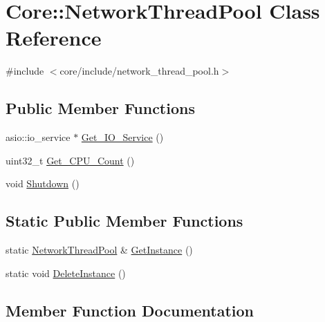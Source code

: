 \hypertarget{classCore_1_1NetworkThreadPool}{}\section{Core\+:\+:Network\+Thread\+Pool Class Reference}
\label{classCore_1_1NetworkThreadPool}


{\ttfamily \#include $<$core/include/network\+\_\+thread\+\_\+pool.\+h$>$}

\subsection*{Public Member Functions}
\begin{DoxyCompactItemize}
\item 
asio\+::io\+\_\+service $\ast$ \hyperlink{classCore_1_1NetworkThreadPool_a806049a0f81423dd7b5bbe4ecf9595ce}{Get\+\_\+\+I\+O\+\_\+\+Service} ()
\item 
uint32\+\_\+t \hyperlink{classCore_1_1NetworkThreadPool_a449726519e2f11f0a7e209ee524f20b6}{Get\+\_\+\+C\+P\+U\+\_\+\+Count} ()
\item 
void \hyperlink{classCore_1_1NetworkThreadPool_a37f50e346f62c863395212f8e721c905}{Shutdown} ()
\end{DoxyCompactItemize}
\subsection*{Static Public Member Functions}
\begin{DoxyCompactItemize}
\item 
static \hyperlink{classCore_1_1NetworkThreadPool}{Network\+Thread\+Pool} \& \hyperlink{classCore_1_1NetworkThreadPool_aeb800288ea586a872e3bb83beb16b7f1}{Get\+Instance} ()
\item 
static void \hyperlink{classCore_1_1NetworkThreadPool_a685b55316311a89b91303ea37237226b}{Delete\+Instance} ()
\end{DoxyCompactItemize}


\subsection{Member Function Documentation}
